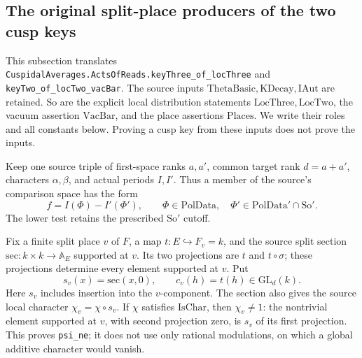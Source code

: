 \subsection{The original split-place producers of the two cusp keys}
\label{subsec:sr-source-acts-of-reads}

This subsection translates
\texttt{CuspidalAverages.ActsOfReads.keyThree\_of\_locThree} and
\texttt{keyTwo\_of\_locTwo\_vacBar}.
The source inputs \(\mathrm{ThetaBasic},\mathrm{KDecay},\mathrm{IAut}\)
are retained. So are the explicit local distribution statements
\(\mathrm{LocThree},\mathrm{LocTwo}\), the vacuum assertion
\(\mathrm{VacBar}\), and the place assertions \(\mathrm{Places}\).
We write their roles and all constants below.
Proving a cusp key from these inputs does not prove the inputs.

Keep one source triple of first-space ranks \(a,a'\), common target
rank \(d=a+a'\), characters \(\alpha,\beta\), and actual periods
\(I,I'\). Thus a member of the source's comparison space has the
form
\[
 f=I(\Phi)-I'(\Phi'),\qquad
 \Phi\in\mathrm{PolData},\quad
 \Phi'\in\mathrm{PolData}'\cap\mathrm{So}'.
 \tag{AK1}\label{eq:sr-source-key-comparison}
\]
The lower test retains the prescribed \(\mathrm{So}'\) cutoff.

Fix a finite split place \(v\) of \(F\), a map
\(t:E\hookrightarrow F_v=k\), and the source split section
\(\mathrm{sec}:k\times k\to\mathbb A_E\) supported at \(v\).
Its two projections are \(t\) and \(t\circ\sigma\);
these projections determine every element supported at \(v\).
Put
\[
 s_v(x)=\mathrm{sec}(x,0),\qquad
 c_v(h)=t(h)\in\mathrm{GL}_d(k).
\]
Here \(s_v\) includes insertion into the \(v\)-component.
The section also gives the source local character
\(\chi_v=\chi\circ s_v\).
If \(\chi\) satisfies \(\mathrm{IsChar}\), then
\(\chi_v\ne1\): the nontrivial element supported at \(v\),
with second projection zero, is \(s_v\) of its first projection.
This proves \texttt{psi\_ne}; it does not use only rational
modulations, on which a global additive character would vanish.

